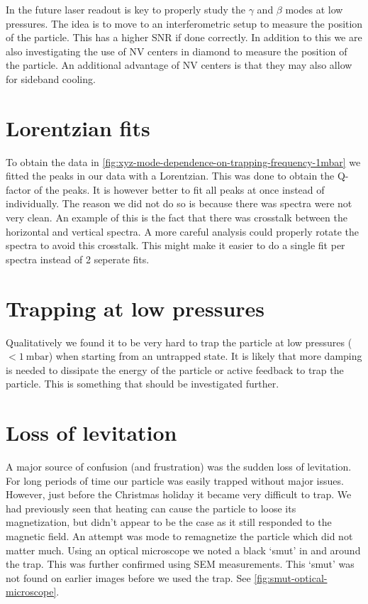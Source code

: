 In the future laser readout is key to properly study the $\gamma$ and $\beta$ modes at low pressures. The idea is to move to an interferometric setup to measure the position of the particle. This has a higher SNR if done correctly. In addition to this we are also investigating the use of NV centers in diamond to measure the position of the particle. An additional advantage of NV centers is that they may also allow for sideband cooling.

\section*{Lorentzian fits}
To obtain the data in \autoref{fig:xyz-mode-dependence-on-trapping-frequency-1mbar} we fitted the peaks in our data with a Lorentzian. This was done to obtain the Q-factor of the peaks. It is however better to fit all peaks at once instead of individually. The reason we did not do so is because there was spectra were not very clean. An example of this is the fact that there was crosstalk between the horizontal and vertical spectra. A more careful analysis could properly rotate the spectra to avoid this crosstalk. This might make it easier to do a single fit per spectra instead of 2 seperate fits.

\section*{Trapping at low pressures}
Qualitatively we found it to be very hard to trap the particle at low pressures ($<\qty{1}{\milli\bar}$) when starting from an untrapped state. It is likely that more damping is needed to dissipate the energy of the particle or active feedback to trap the particle. This is something that should be investigated further.

\section*{Loss of levitation}
A major source of confusion (and frustration) was the sudden loss of levitation. For long periods of time our particle was easily trapped without major issues. However, just before the Christmas holiday it became very difficult to trap. We had previously seen that heating can cause the particle to loose its magnetization, but didn't appear to be the case as it still responded to the magnetic field. An attempt was mode to remagnetize the particle which did not matter much. Using an optical microscope we noted a black `smut' in and around the trap. This was further confirmed using SEM measurements. This `smut' was not found on earlier images before we used the trap. See \autoref{fig:smut-optical-microscope}.

